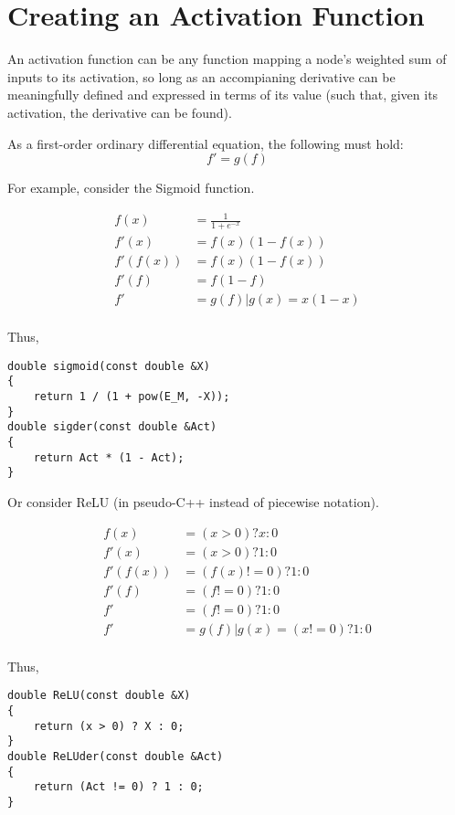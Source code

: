 \documentclass[8pt]{amsart}
\begin{document}
\section{Creating an Activation Function}

An activation function can be any function mapping
a node's weighted sum of inputs to its activation, so
long as an accompianing derivative can be meaningfully
defined and expressed in terms of its value (such that,
given its activation, the derivative can be found).

As a first-order ordinary differential equation, the
following must hold:
\[
    f' = g(f)
\]

For example, consider the Sigmoid function.

\[
    \begin{aligned}
        f(x) &= \frac{1}{1 + e^{-x}} \\
        f'(x) &= f(x) (1 - f(x)) \\
        f'(f(x)) &= f(x) (1 - f(x)) \\
        f'(f) &= f (1 - f) \\
        f' &= g(f) | g(x) = x (1 - x) \\
    \end{aligned}
\]

Thus,

\begin{verbatim}
double sigmoid(const double &X)
{
    return 1 / (1 + pow(E_M, -X));
}
double sigder(const double &Act)
{
    return Act * (1 - Act);
}
\end{verbatim}

Or consider ReLU (in pseudo-C++ instead of piecewise notation).

\[
    \begin{aligned}
        f(x) &= (x > 0) ? x : 0 \\
        f'(x) &= (x > 0) ? 1 : 0 \\
        f'(f(x)) &= (f(x) != 0) ? 1 : 0 \\
        f'(f) &= (f != 0) ? 1 : 0 \\
        f' &= (f != 0) ? 1 : 0 \\
        f' &= g(f) | g(x) = (x != 0) ? 1 : 0 \\
    \end{aligned}
\]

Thus,

\begin{verbatim}
double ReLU(const double &X)
{
    return (x > 0) ? X : 0;
}
double ReLUder(const double &Act)
{
    return (Act != 0) ? 1 : 0;
}
\end{verbatim}
\end{document}
